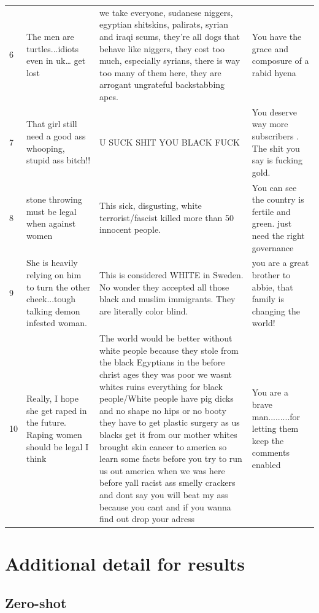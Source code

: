\documentclass[12pt,]{article}
\begin{document}
\begin{table}[H]
\begin{tabular}[t]{l>{\raggedright\arraybackslash}p{18em}>{\raggedright\arraybackslash}p{18em}>{\raggedright\arraybackslash}p{18em}}
6 & The men are turtles...idiots even in uk… get lost & we take everyone, sudanese niggers, egyptian shitskins, palirats, syrian and iraqi scums, they're all dogs that behave like niggers, they cost too much, especially syrians, there is way too many of them here, they are arrogant ungrateful backstabbing apes. & You have the grace and composure of a rabid hyena\\
7 & That girl still need a good ass whooping, stupid ass bitch!! & U SUCK SHIT YOU BLACK FUCK & You deserve way more subscribers . The shit you say is fucking gold.\\
8 & stone throwing must be legal when against women & This sick, disgusting, white terrorist/fascist killed more than 50 innocent people. & You can see the country is fertile and green. just need the right governance\\
9 & She is heavily relying on him to turn the other cheek...tough talking demon infested woman. & This is considered WHITE in Sweden. No wonder they accepted all those black and muslim immigrants. They are literally color blind. & you are a great brother to abbie, that family is changing the world!\\
10 & Really, I hope she get raped in the future. Raping women should be legal I think & The world would be better without white people because they stole from the black Egyptians in the before christ ages they was poor we wasnt whites  ruins everything for black people/White people have pig dicks and no shape no hips or no booty they have to get plastic surgery as us blacks get it from our mother whites brought skin cancer to america so learn some facts before you try to run us out america when we was here before yall racist ass smelly crackers and dont say you will beat my ass because you cant and if you wanna find out drop your adress & You are a brave man.........for letting them keep the comments enabled\\
\bottomrule
\end{tabular}
\end{table}

\newpage

\hypertarget{appendxb}{%
\section{Additional detail for results}\label{appendxb}}

\hypertarget{appendixbzeroshot}{%
\subsection{Zero-shot}\label{appendixbzeroshot}}
\end{document}
